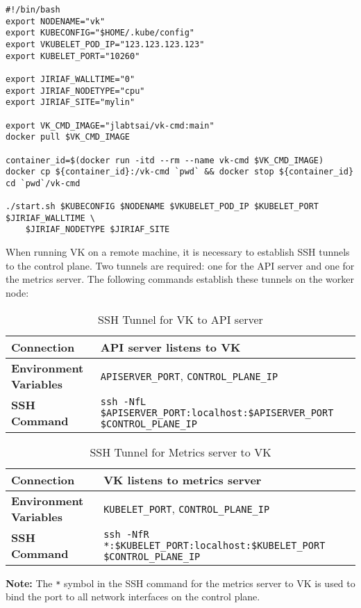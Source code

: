 \begin{verbatim}
#!/bin/bash
export NODENAME="vk"
export KUBECONFIG="$HOME/.kube/config"
export VKUBELET_POD_IP="123.123.123.123"
export KUBELET_PORT="10260"

export JIRIAF_WALLTIME="0"
export JIRIAF_NODETYPE="cpu"
export JIRIAF_SITE="mylin"

export VK_CMD_IMAGE="jlabtsai/vk-cmd:main"
docker pull $VK_CMD_IMAGE

container_id=$(docker run -itd --rm --name vk-cmd $VK_CMD_IMAGE)
docker cp ${container_id}:/vk-cmd `pwd` && docker stop ${container_id}
cd `pwd`/vk-cmd

./start.sh $KUBECONFIG $NODENAME $VKUBELET_POD_IP $KUBELET_PORT $JIRIAF_WALLTIME \
    $JIRIAF_NODETYPE $JIRIAF_SITE
\end{verbatim}

When running VK on a remote machine, it is necessary to establish SSH tunnels to the control plane. Two tunnels are required: one for the API server and one for the metrics server. The following commands establish these tunnels on the worker node:

\begin{table}[h!]
\centering
\caption{SSH Tunnel for VK to API server}
\begin{tabular}{|l|l|}
\hline
\textbf{Connection} & API server listens to VK \\
\hline
\textbf{Environment Variables} & \texttt{APISERVER\_PORT}, \texttt{CONTROL\_PLANE\_IP} \\
\hline
\textbf{SSH Command} & \texttt{ssh -NfL \$APISERVER\_PORT:localhost:\$APISERVER\_PORT \$CONTROL\_PLANE\_IP} \\
\hline
\end{tabular}
\label{table:ssh_tunnel_vk_to_api}
\end{table}

\begin{table}[h!]
\centering
\caption{SSH Tunnel for Metrics server to VK}
\begin{tabular}{|l|l|}
\hline
\textbf{Connection} & VK listens to metrics server \\
\hline
\textbf{Environment Variables} & \texttt{KUBELET\_PORT}, \texttt{CONTROL\_PLANE\_IP} \\
\hline
\textbf{SSH Command} & \texttt{ssh -NfR *:\$KUBELET\_PORT:localhost:\$KUBELET\_PORT \$CONTROL\_PLANE\_IP} \\
\hline
\end{tabular}
\label{table:ssh_tunnel_metrics_to_vk}
\end{table}

\textbf{Note:} The \texttt{*} symbol in the SSH command for the metrics server to VK is used to bind the port to all network interfaces on the control plane.
